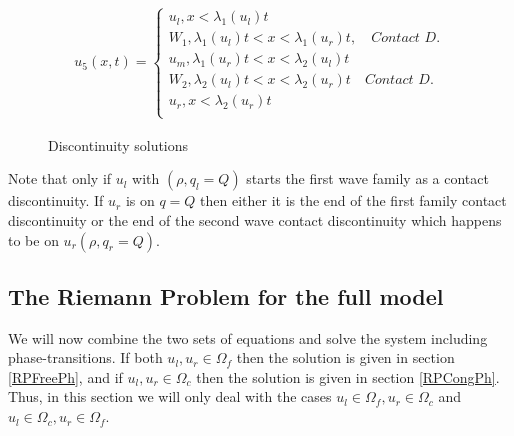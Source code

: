 \documentclass{article}
\numberwithin{equation}{section}
\begin{document}
\begin{align*}
    u_5(x,t) = \begin{cases}
    u_l, x < \lambda_1(u_l)t\\
    W_1, \lambda_1(u_l)t < x < \lambda_1(u_r)t, \quad \textit{Contact D.}\\ 
    u_m, \lambda_1(u_r)t < x < \lambda_2(u_l)t \\
    W_2, \lambda_2(u_l)t < x < \lambda_2(u_r)t \quad \textit{Contact D.} \\
    u_r, x < \lambda_2(u_r)t \\
    \end{cases}
\end{align*}


\begin{figure}
    \caption{Discontinuity solutions}
    \label{Fig:u_5}
\end{figure}

Note that only if $u_l$ with $(\rho, q_l = Q)$ starts the first wave family as a contact discontinuity. If $u_r$ is on $q = Q$ then either it is the end of the first family contact discontinuity or the end of the second wave contact discontinuity which happens to be on $u_r(\rho, q_r = Q)$.



\subsection{The Riemann Problem for the full model}
We will now combine the two sets of equations and solve the system including phase-transitions. If both $u_l, u_r \in \Omega_f$ then the solution is given in section \ref{RPFreePh}, and if $u_l, u_r \in \Omega_c$ then the solution is given in section \ref{RPCongPh}. Thus, in this section we will only deal with the cases $u_l \in \Omega_f, u_r \in \Omega_c$ and $u_l \in \Omega_c, u_r \in \Omega_f$.
\end{document}
